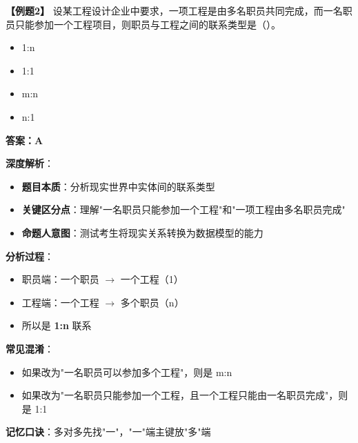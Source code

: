 \documentclass[12pt, a4paper]{article}
\newenvironment{bluebox}[1]{%
  \begin{trivlist}
  \item[\hskip\labelsep \textbf{#1}]
  \setlength{\parskip}{0.5ex}
  \setlength{\itemsep}{0.5ex}
}{%
  \end{trivlist}
}
\begin{document}
\begin{bluebox}{例题2：实体间联系类型}
	\textbf{【例题2】} 设某工程设计企业中要求，一项工程是由多名职员共同完成，而一名职员只能参加一个工程项目，则职员与工程之间的联系类型是（\quad）。

	\begin{itemize}
		\item[A)] 1:n
		\item[B)] 1:1
		\item[C)] m:n
		\item[D)] n:1
	\end{itemize}

	\textbf{答案：A}

	\textbf{深度解析}：

	\begin{itemize}
		\item \textbf{题目本质}：分析现实世界中实体间的联系类型
		\item \textbf{关键区分点}：理解"一名职员只能参加一个工程"和"一项工程由多名职员完成"
		\item \textbf{命题人意图}：测试考生将现实关系转换为数据模型的能力
	\end{itemize}

	\textbf{分析过程}：

	\begin{itemize}
		\item 职员端：一个职员 $\rightarrow$ 一个工程（1）
		\item 工程端：一个工程 $\rightarrow$ 多个职员（n）
		\item 所以是 \textbf{1:n} 联系
	\end{itemize}

	\textbf{常见混淆}：

	\begin{itemize}
		\item 如果改为"一名职员可以参加多个工程"，则是 m:n
		\item 如果改为"一名职员只能参加一个工程，且一个工程只能由一名职员完成"，则是 1:1
	\end{itemize}

	\textbf{记忆口诀}：多对多先找"一"，"一"端主键放"多"端
\end{bluebox}
\end{document}
